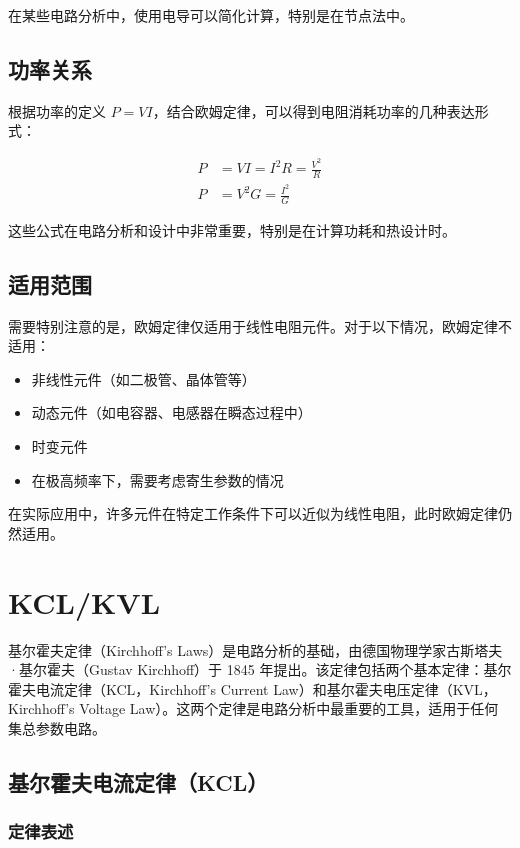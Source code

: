 在某些电路分析中，使用电导可以简化计算，特别是在节点法中。

\subsection{功率关系}

根据功率的定义 $P = VI$，结合欧姆定律，可以得到电阻消耗功率的几种表达形式：

\begin{align}
P &= VI = I^2R = \frac{V^2}{R} \label{eq:power-ohm} \\
P &= V^2G = \frac{I^2}{G} \label{eq:power-conductance}
\end{align}

这些公式在电路分析和设计中非常重要，特别是在计算功耗和热设计时。

\subsection{适用范围}

需要特别注意的是，欧姆定律仅适用于线性电阻元件。对于以下情况，欧姆定律不适用：

\begin{itemize}
  \item 非线性元件（如二极管、晶体管等）
  \item 动态元件（如电容器、电感器在瞬态过程中）
  \item 时变元件
  \item 在极高频率下，需要考虑寄生参数的情况
\end{itemize}

在实际应用中，许多元件在特定工作条件下可以近似为线性电阻，此时欧姆定律仍然适用。

\section{KCL/KVL}

基尔霍夫定律（Kirchhoff's Laws）是电路分析的基础，由德国物理学家古斯塔夫·基尔霍夫（Gustav Kirchhoff）于 1845 年提出。该定律包括两个基本定律：基尔霍夫电流定律（KCL，Kirchhoff's Current Law）和基尔霍夫电压定律（KVL，Kirchhoff's Voltage Law）。这两个定律是电路分析中最重要的工具，适用于任何集总参数电路。

\subsection{基尔霍夫电流定律（KCL）}

\subsubsection{定律表述}

